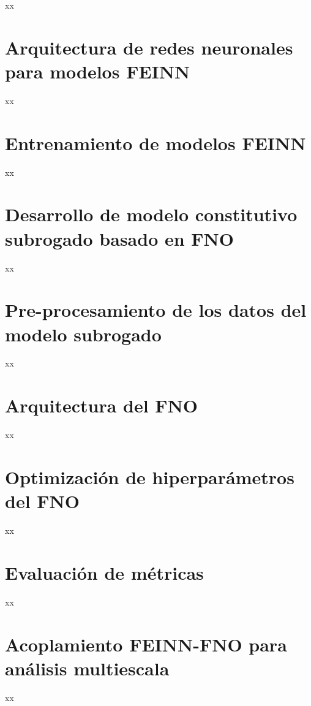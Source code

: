 xx

\section{Arquitectura de redes neuronales para modelos FEINN}

xx

\section{Entrenamiento de modelos FEINN}

xx

\section{Desarrollo de modelo constitutivo subrogado basado en FNO}

xx

\section{Pre-procesamiento de los datos del modelo subrogado}

xx

\section{Arquitectura del FNO}

xx


\section{Optimización de hiperparámetros del FNO}

xx

\section{Evaluación de métricas}

xx

\section{Acoplamiento FEINN-FNO para análisis multiescala}

xx

